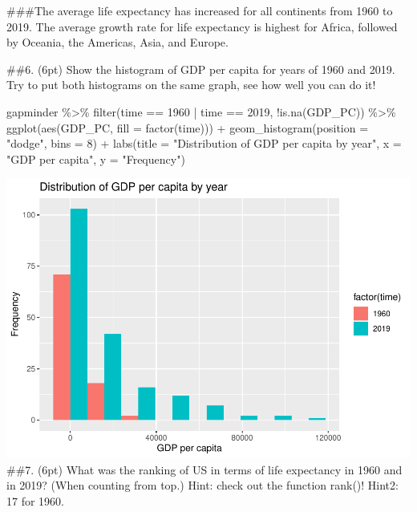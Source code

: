 \documentclass[
]{article}
\newenvironment{Shaded}{\begin{snugshade}}{\end{snugshade}}
\newcommand{\AttributeTok}[1]{\textcolor[rgb]{0.77,0.63,0.00}{#1}}
\newcommand{\DecValTok}[1]{\textcolor[rgb]{0.00,0.00,0.81}{#1}}
\newcommand{\FunctionTok}[1]{\textcolor[rgb]{0.00,0.00,0.00}{#1}}
\newcommand{\NormalTok}[1]{#1}
\newcommand{\SpecialCharTok}[1]{\textcolor[rgb]{0.00,0.00,0.00}{#1}}
\newcommand{\StringTok}[1]{\textcolor[rgb]{0.31,0.60,0.02}{#1}}
\begin{document}
\#\#\#The average life expectancy has increased for all continents from
1960 to 2019. The average growth rate for life expectancy is highest for
Africa, followed by Oceania, the Americas, Asia, and Europe.

\#\#6. (6pt) Show the histogram of GDP per capita for years of 1960 and
2019. Try to put both histograms on the same graph, see how well you can
do it!

\begin{Shaded}
\begin{Highlighting}[]
\NormalTok{gapminder }\SpecialCharTok{\%\textgreater{}\%}
  \FunctionTok{filter}\NormalTok{(time }\SpecialCharTok{==} \DecValTok{1960} \SpecialCharTok{|}\NormalTok{ time }\SpecialCharTok{==} \DecValTok{2019}\NormalTok{,}
         \SpecialCharTok{!}\FunctionTok{is.na}\NormalTok{(GDP\_PC)) }\SpecialCharTok{\%\textgreater{}\%}
  \FunctionTok{ggplot}\NormalTok{(}\FunctionTok{aes}\NormalTok{(GDP\_PC, }\AttributeTok{fill =} \FunctionTok{factor}\NormalTok{(time))) }\SpecialCharTok{+}
  \FunctionTok{geom\_histogram}\NormalTok{(}\AttributeTok{position =} \StringTok{"dodge"}\NormalTok{, }\AttributeTok{bins =} \DecValTok{8}\NormalTok{) }\SpecialCharTok{+}
  \FunctionTok{labs}\NormalTok{(}\AttributeTok{title =} \StringTok{"Distribution of GDP per capita by year"}\NormalTok{, }\AttributeTok{x =} \StringTok{"GDP per capita"}\NormalTok{, }\AttributeTok{y =} \StringTok{"Frequency"}\NormalTok{) }
\end{Highlighting}
\end{Shaded}

\includegraphics{ps05-rmarkdown_files/figure-latex/unnamed-chunk-18-1.pdf}
\#\#7. (6pt) What was the ranking of US in terms of life expectancy in
1960 and in 2019? (When counting from top.) Hint: check out the function
rank()! Hint2: 17 for 1960.
\end{document}
